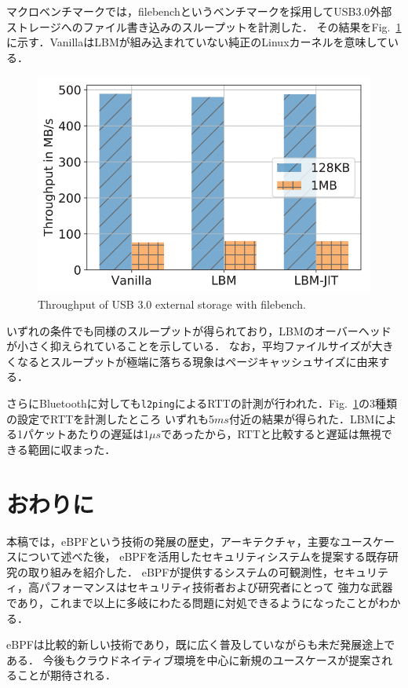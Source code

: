 \documentclass[platex,a4j,10pt,twoside,twocolumn,dvipdfmx]{jsarticle}
\newcommand{\Fref}[1]{Fig.~\ref{#1}}
\begin{document}
マクロベンチマークでは，filebenchというベンチマークを採用してUSB3.0外部ストレージへのファイル書き込みのスループットを計測した．
その結果を\Fref{img:file-bench}に示す．VanillaはLBMが組み込まれていない純正のLinuxカーネルを意味している．
\begin{figure}[tp]
  \begin{center}
    \includegraphics[width=\columnwidth]{./img/macro-graph.png}
  \end{center}
  \caption{Throughput of USB 3.0 external storage with filebench. \cite{tian2019lbm}}
  \label{img:file-bench}
\end{figure}
いずれの条件でも同様のスループットが得られており，LBMのオーバーヘッドが小さく抑えられていることを示している．
なお，平均ファイルサイズが大きくなるとスループットが極端に落ちる現象はページキャッシュサイズに由来する．

さらにBluetoothに対しても\texttt{l2ping}によるRTTの計測が行われた．\Fref{img:file-bench}の3種類の設定でRTTを計測したところ
いずれも5$ms$付近の結果が得られた．LBMによる1パケットあたりの遅延は1$\mu s$であったから，RTTと比較すると遅延は無視できる範囲に収まった．

\section{おわりに}
本稿では，eBPFという技術の発展の歴史，アーキテクチャ，主要なユースケースについて述べた後，
eBPFを活用したセキュリティシステムを提案する既存研究の取り組みを紹介した．
eBPFが提供するシステムの可観測性，セキュリティ，高パフォーマンスはセキュリティ技術者および研究者にとって
強力な武器であり，これまで以上に多岐にわたる問題に対処できるようになったことがわかる．

eBPFは比較的新しい技術であり，既に広く普及していながらも未だ発展途上である．
今後もクラウドネイティブ環境を中心に新規のユースケースが提案されることが期待される．


{
  \footnotesize
  
}
\end{document}
